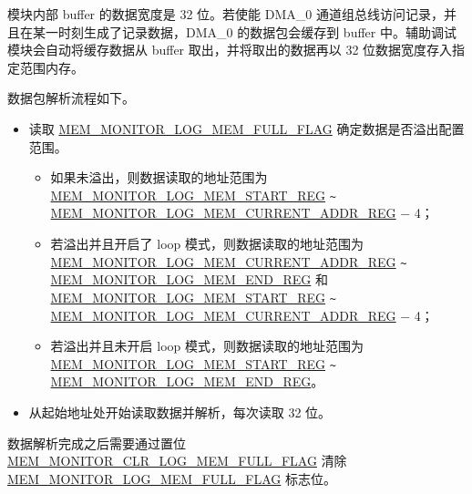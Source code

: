 \documentclass[main\_\_CN.tex]{subfiles}
\begin{document}
模块内部 buffer 的数据宽度是 32 位。若使能 DMA\_0 通道组总线访问记录，并且在某一时刻生成了记录数据，DMA\_0 的数据包会缓存到 buffer 中。辅助调试模块会自动将缓存数据从 buffer 取出，并将取出的数据再以 32 位数据宽度存入指定范围内存。

数据包解析流程如下。

\begin{itemize}
    \item 读取 \hyperref[fielddesc:MEMMONITORLOGMEMFULLFLAG]{MEM\_MONITOR\_LOG\_MEM\_FULL\_FLAG} 确定数据是否溢出配置范围。
    \begin{itemize}
        \item 如果未溢出，则数据读取的地址范围为 \hyperref[regdesc:MEMMONITORLOGMEMSTARTREG]{MEM\_MONITOR\_LOG\_MEM\_START\_REG}  \verb+~+ \hyperref[regdesc:MEMMONITORLOGMEMCURRENTADDRREG]{MEM\_MONITOR\_LOG\_MEM\_CURRENT\_ADDR\_REG} $-$ 4；
        \item 若溢出并且开启了 loop 模式，则数据读取的地址范围为 \hyperref[regdesc:MEMMONITORLOGMEMCURRENTADDRREG]{MEM\_MONITOR\_LOG\_MEM\_CURRENT\_ADDR\_REG} \verb+~+ \hyperref[regdesc:MEMMONITORLOGMEMENDREG]{MEM\_MONITOR\_LOG\_MEM\_END\_REG} 和 \hyperref[regdesc:MEMMONITORLOGMEMSTARTREG]{MEM\_MONITOR\_LOG\_MEM\_START\_REG} \verb+~+ \hyperref[regdesc:MEMMONITORLOGMEMCURRENTADDRREG]{MEM\_MONITOR\_LOG\_MEM\_CURRENT\_ADDR\_REG} $-$ 4；
        \item 若溢出并且未开启 loop 模式，则数据读取的地址范围为 \hyperref[regdesc:MEMMONITORLOGMEMSTARTREG]{MEM\_MONITOR\_LOG\_MEM\_START\_REG} \verb+~+ \hyperref[regdesc:MEMMONITORLOGMEMENDREG]{MEM\_MONITOR\_LOG\_MEM\_END\_REG}。
    \end{itemize}
    \item 从起始地址处开始读取数据并解析，每次读取 32 位。
\end{itemize}

数据解析完成之后需要通过置位 \hyperref[fielddesc:MEMMONITORCLRLOGMEMFULLFLAG]{MEM\_MONITOR\_CLR\_LOG\_MEM\_FULL\_FLAG} 清除 \hyperref[fielddesc:MEMMONITORLOGMEMFULLFLAG]{MEM\_MONITOR\_LOG\_MEM\_FULL\_FLAG} 标志位。


\end{document}
